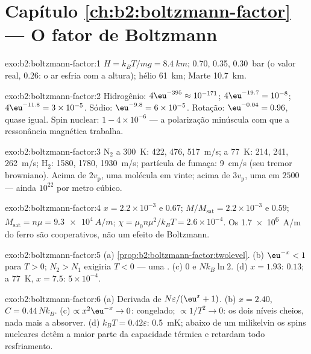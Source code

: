 \section*{Capítulo \ref{ch:b2:boltzmann-factor} --- O fator de Boltzmann}

\begin{solution}{exo:b2:boltzmann-factor:1}
$H = k_BT/mg = \qty{8.4}{km}$; \qty{0.70}{}, \qty{0.35}{}, \qty{0.30}{bar} (o valor real,
\qty{0.26}{}: o ar esfria com a altura); hélio \qty{61}{km}; Marte
\qty{10.7}{km}.
\end{solution}

\begin{solution}{exo:b2:boltzmann-factor:2}
Hidrogênio: $4\eu^{-395} \approx 10^{-171}$; $4\eu^{-19.7} = 10^{-8}$; $4\eu^{-11.8} = 3 \times
10^{-5}$. Sódio: $\eu^{-9.8} = 6 \times 10^{-5}$. Rotação: $\eu^{-0.04} = 0.96$, quase
igual. Spin nuclear: $1 - 4 \times 10^{-6}$ --- a polarização minúscula com que
a ressonância magnética trabalha.
\end{solution}

\begin{solution}{exo:b2:boltzmann-factor:3}
N$_2$ a \qty{300}{K}: \qty{422}{}, \qty{476}{}, \qty{517}{m/s}; a \qty{77}{K}: \qty{214}{}, \qty{241}{},
\qty{262}{m/s}; H$_2$: \qty{1580}{}, \qty{1780}{}, \qty{1930}{m/s}; partícula de fumaça:
\qty{9}{cm/s} (seu tremor browniano). Acima de $2v_{\text{p}}$, uma molécula em
vinte; acima de $3v_{\text{p}}$, uma em $2500$ --- ainda $10^{22}$ por metro cúbico.
\end{solution}

\begin{solution}{exo:b2:boltzmann-factor:4}
$x = 2.2 \times 10^{-3}$ e $0.67$; $M/M_{\text{sat}} = 2.2 \times 10^{-3}$ e $0.59$;
$M_{\text{sat}} = n\mu = \qty{9.3e4}{A/m}$; $\chi = \mu_0n\mu^2/k_BT = 2.6 \times 10^{-4}$.
Os \qty{1.7e6}{A/m} do ferro são cooperativos, não um efeito de Boltzmann.
\end{solution}

\begin{solution}{exo:b2:boltzmann-factor:5}
(a) \cref{prop:b2:boltzmann-factor:twolevel}. (b) $\eu^{-x} < 1$ para $T > 0$;
$N_2 > N_1$ exigiria $T < 0$ --- uma . (c) $0$ e
$Nk_B\ln 2$. (d) $x = 1.93$: $0.13$; a \qty{77}{K}, $x = 7.5$: $5 \times 10^{-4}$.
\end{solution}

\begin{solution}{exo:b2:boltzmann-factor:6}
(a) Derivada de $N\varepsilon/(\eu^x + 1)$. (b) $x = 2.40$, $C = 0.44\,Nk_B$.
(c) $\propto x^2\eu^{-x} \to 0$: congelado; $\propto 1/T^2 \to 0$: os dois níveis cheios,
nada mais a absorver. (d) $k_BT = 0.42\varepsilon$: \qty{0.5}{mK}; abaixo de um
milikelvin os spins nucleares detêm a maior parte da capacidade térmica e
retardam todo resfriamento.
\end{solution}


